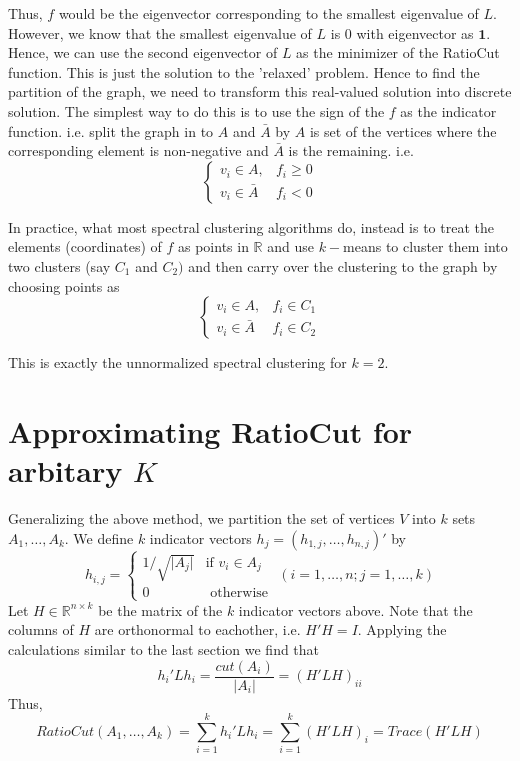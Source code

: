 \documentclass[10pt,a4paper, nocenter]{report}
\newcommand{\abs}[1]{\lvert {#1} \rvert}
\begin{document}
	Thus, $f$ would be the eigenvector corresponding to the smallest eigenvalue of $L$. However, we know that the smallest eigenvalue of $L$ is $0$ with eigenvector as $\mathbf{1}$. Hence, we can use the second eigenvector of $L$ as the minimizer of the RatioCut function. This is just the solution to the 'relaxed' problem. Hence to find the partition of the graph, we need to transform this real-valued solution into discrete solution. The simplest way to do this is to use the sign of the $f$ as the indicator function. i.e. split the graph in to $A$ and $\bar{A}$ by $A$ is set of the vertices where the corresponding element is non-negative and $\bar{A}$ is the remaining. i.e. $$\begin{cases}
	v_{i} \in A, &f_{i} \ge 0\\ v_{i} \in \bar{A} & f_{i} < 0
	\end{cases} $$
	
	In practice, what most spectral clustering algorithms do, instead is to treat the elements (coordinates) of $f$ as points in $\mathbb{R}$ and use $k-$means to cluster them into two clusters (say $C_{1}$ and $C_{2})$ and then carry over the clustering to the graph by choosing points as 
	$$\begin{cases}
	v_{i} \in A, &f_{i} \in C_{1}\\ v_{i} \in \bar{A} & f_{i} \in C_{2}
	\end{cases} $$
	
	This is exactly the unnormalized spectral clustering for $k=2$. 
	
	\section{Approximating RatioCut for arbitary $K$}
	Generalizing the above method, we partition the set of vertices $V$ into $k$ sets $A_{1},\dots,A_{k}$. We define $k$ indicator vectors $h_{j} = (h_{1,j},\dots,h_{n,j})'$ by $$ h_{i,j} = \begin{cases}
	1/\sqrt{\abs{A_{j}}} & \text{if } v_{i}\in A_{j}\\ 0 &\text{ otherwise }
	\end{cases} (i = 1,\dots,n; j=1,\dots,k)$$
	Let $H \in \mathbb{R}^{n\times k}$ be the matrix of the $k$ indicator vectors above. Note that the columns of $H$ are orthonormal to eachother, i.e. $H'H = I$. Applying the calculations similar to the last section we find that $$h_{i}'Lh_{i} = \frac{cut(A_{i})}{\abs{A_{i}}} = (H'LH)_{ii}$$
	Thus,
	$$ RatioCut(A_{1},\dots,A_{k}) = \sum_{i=1}^{k}h_{i}'Lh_{i} = \sum_{i=1}^{k}(H'LH)_{i} = Trace(H'LH)$$
	
\end{document}
